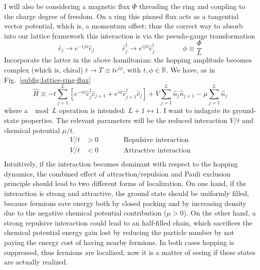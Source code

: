 I will also be considering a magnetic flux $\Phi$ threading the ring and coupling to the charge degree of freedom. On a ring this pinned flux acts as a tangential vector potential, which is, a momentum offset; thus the correct way to absorb into our lattice framework this interaction is via the pseudo-gauge transformation
\begin{equation}\label{eq:pseudo-gauge-transformation}
	\hat c_j \to e^{-ij \phi} \hat c_j
	\qquad\qquad
	\hat c_j^\dagger \to e^{ij \phi} \hat c_j^\dagger
	\qquad\qquad
	\phi \equiv \frac{\Phi}{L}
\end{equation}
Incorporate the latter in the above hamiltonian: the hopping amplitude becomes complex (which is, chiral) $t \to T \equiv t e^{i\phi}$, with $t, \phi \in \mathbb{R}$. We have, as in Fig.~\ref{subfig:lattice-ring-flux}
\begin{equation}\label{eq:spinless-hamiltonian-tbc}
	\hat H \equiv -t \sum_{j=1}^L \left[ 
		e^{-i\phi} \hat c_j^\dagger \hat c_{j+1} + e^{i\phi} \hat c_{j+1}^\dagger \hat c_j 
	\right] + V \sum_{j=1}^L \hat n_j \hat n_{j+1} - \mu \sum_{j=1}^L \hat n_j
\end{equation}
where a $\mod L$ operation is intended: $L+1 \leftrightarrow 1$. I want to indagate its ground-state properties. The relevant parameters will be the reduced interaction $V/t$ and chemical potential $\mu/t$.
\[
	\begin{aligned}
		V/t &> 0 \qquad
		&&\text{Repulsive interaction} \\
		V/t &< 0 \qquad
		&&\text{Attractive interaction} \\
	\end{aligned}
\]
Intuitively, if the interaction becomes dominant with respect to the hopping dynamics, the combined effect of attraction/repulsion and Pauli exclusion principle should lead to two different forms of localization. On one hand, if the interaction is strong and attractive, the ground state should be uniformly filled, because fermions save energy both by closed packing and by increasing density due to the negative chemical potential contribution ($\mu > 0$). On the other hand, a strong repulsive interaction could lead to an half-filled chain, which sacrifices the chemical potential energy gain lost by reducing the particle number by not paying the energy cost of having nearby fermions. In both cases hopping is suppressed, thus fermions are localized; now it is a matter of seeing if these states are actually realized.

